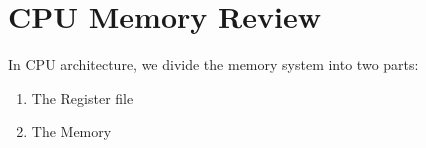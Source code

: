 \section{CPU Memory Review}

In CPU architecture, we divide the memory system into two parts:
\begin{enumerate}
  \item The Register file
  \item The Memory
\end{enumerate}
